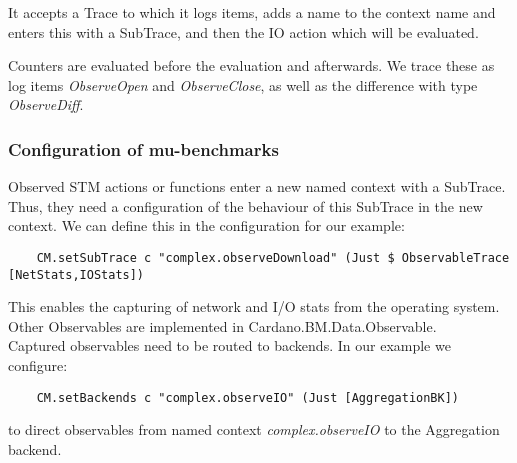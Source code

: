 It accepts a Trace to which it logs items, adds a name to the context name and
enters this with a SubTrace, and then the IO action which will be evaluated.

Counters are evaluated before the evaluation and afterwards. We trace these as
log items \emph{ObserveOpen} and \emph{ObserveClose}, as well as the difference
with type \emph{ObserveDiff}.

\subsubsection{Configuration of mu-benchmarks}

Observed STM actions or functions enter a new named context with a SubTrace.
Thus, they need a configuration of the behaviour of this SubTrace in the new
context. We can define this in the configuration for our example:
\begin{verbatim}
    CM.setSubTrace c "complex.observeDownload" (Just $ ObservableTrace [NetStats,IOStats])
\end{verbatim}

This enables the capturing of network and I/O stats from the operating system.
Other Observables are implemented in Cardano.BM.Data.Observable.
\\
Captured observables need to be routed to backends. In our example we configure:
\begin{verbatim}
    CM.setBackends c "complex.observeIO" (Just [AggregationBK])
\end{verbatim}
to direct observables from named context \emph{complex.observeIO} to the
Aggregation backend.

